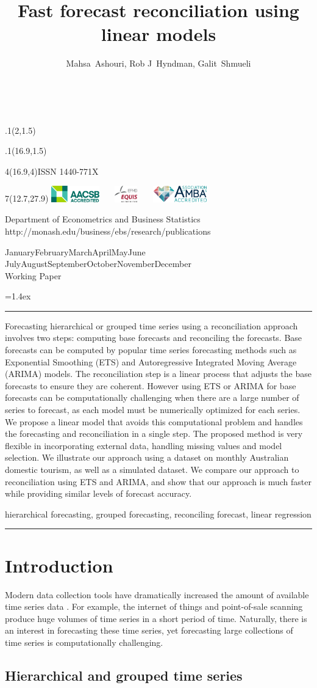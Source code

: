 \documentclass[11pt,a4paper,]{article}
\title{Fast forecast reconciliation using linear models}
\author{Mahsa~Ashouri, Rob J~Hyndman, Galit~Shmueli}
\date{\sf\Date~\Month~\Year}
\makeatletter
\def\Date{\number\day}
\def\Month{\ifcase\month\or
 January\or February\or March\or April\or May\or June\or
 July\or August\or September\or October\or November\or December\fi}
\def\Year{\number\year}
\def\showjel{{\large\textsf{\textbf{JEL classification:}}~\@jel}}
\def\cover{{\sffamily\setcounter{page}{0}
        \thispagestyle{empty}
        \placefig{2}{1.5}{width=5cm}{monash2}
        \placefig{16.9}{1.5}{width=2.1cm}{MBusSchool}
        \begin{textblock}{4}(16.9,4)ISSN 1440-771X\end{textblock}
        \begin{textblock}{7}(12.7,27.9)\hfill
        \includegraphics[height=0.7cm]{AACSB}~~~
        \includegraphics[height=0.7cm]{EQUIS}~~~
        \includegraphics[height=0.7cm]{AMBA}
        \end{textblock}
        \vspace*{2cm}
        \begin{center}\Large
        Department of Econometrics and Business Statistics\\[.5cm]
        \footnotesize http://monash.edu/business/ebs/research/publications
        \end{center}\vspace{2cm}
        \begin{center}
        \fbox{\parbox{14cm}{\begin{onehalfspace}\centering\Huge\vspace*{0.3cm}
                \textsf{\textbf{\expandafter{\@title}}}\vspace{1cm}\par
                \LARGE\@author\end{onehalfspace}
        }}
        \end{center}
        \vfill
                \begin{center}\Large
                \Month~\Year\\[1cm]
                Working Paper \@wp
        \end{center}\vspace*{2cm}}}
\def\pageone{{\sffamily\setstretch{1}%
        \thispagestyle{empty}%
        \vbox to \textheight{%
        \raggedright\baselineskip=1.2cm
     {\fontsize{24.88}{30}\sffamily\textbf{\expandafter{\@title}}}
        \vspace{2cm}\par
        \hspace{1cm}\parbox{14cm}{\sffamily\large\@addresses}\vspace{1cm}\vfill
        \hspace{1cm}{\large\Date~\Month~\Year}\\[1cm]
        \hspace{1cm}\showjel\vss}}}
\def\blindtitle{{\sffamily
     \thispagestyle{plain}\raggedright\baselineskip=1.2cm
     {\fontsize{24.88}{30}\sffamily\textbf{\expandafter{\@title}}}\vspace{1cm}\par
        }}
\def\titlepage{{\cover\newpage\pageone\newpage\blindtitle}}
\let\maketitle\titlepage
\newenvironment{keywords}{\par\vspace{0.5cm}\noindent{\sffamily\textbf{Keywords:}}}{\vspace{0.25cm}\par\hrule\vspace{0.5cm}\par}
\renewenvironment{abstract}{\begin{minipage}{\textwidth}\parskip=1.4ex\noindent
\hrule\vspace{0.1cm}\par{\sffamily\textbf{\abstractname}}\newline}
  {\end{minipage}}
\def\placefig#1#2#3#4{\begin{textblock}{.1}(#1,#2)\rlap{\texttt{[image: \#4]}}\end{textblock}}
\makeatother
\begin{document}
\maketitle
\begin{abstract}
Forecasting hierarchical or grouped time series using a reconciliation approach involves two steps: computing base forecasts and reconciling the forecasts. Base forecasts can be computed by popular time series forecasting methods such as Exponential Smoothing (ETS) and Autoregressive Integrated Moving Average (ARIMA) models. The reconciliation step is a linear process that adjusts the base forecasts to ensure they are coherent. However using ETS or ARIMA for base forecasts can be computationally challenging when there are a large number of series to forecast, as each model must be numerically optimized for each series. We propose a linear model that avoids this computational problem and handles the forecasting and reconciliation in a single step. The proposed method is very flexible in incorporating external data, handling missing values and model selection. We illustrate our approach using a dataset on monthly Australian domestic tourism, as well as a simulated dataset. We compare our approach to reconciliation using ETS and ARIMA, and show that our approach is much faster while providing similar levels of forecast accuracy.
\end{abstract}
\begin{keywords}
hierarchical forecasting, grouped forecasting, reconciling forecast, linear regression
\end{keywords}

\hypertarget{introduction}{%
\section{Introduction}\label{introduction}}

Modern data collection tools have dramatically increased the amount of available time series data \autocite{januschowski2013forecasting}. For example, the internet of things and point-of-sale scanning produce huge volumes of time series in a short period of time. Naturally, there is an interest in forecasting these time series, yet forecasting large collections of time series is computationally challenging.

\hypertarget{hierarchical-and-grouped-time-series}{%
\subsection{Hierarchical and grouped time series}\label{hierarchical-and-grouped-time-series}}
\end{document}
